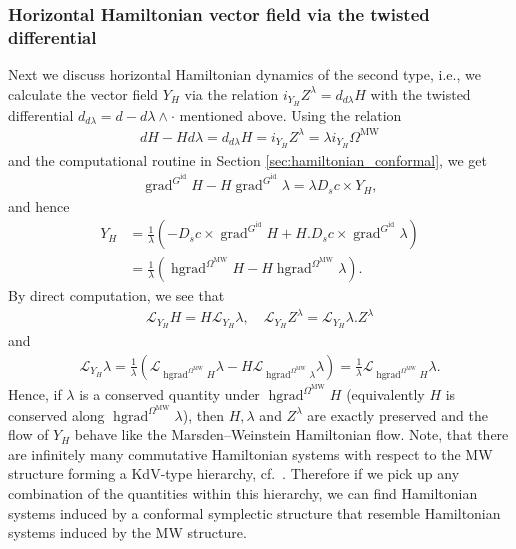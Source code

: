 \documentclass[12pt]{amsart}
\newcommand{\AuthorCOMMENT}[3]{\textcolor{#2}{{[\textbf{#1:} \textsl{#3}}]}}  %
\newcommand{\Sadashige}[1]{\AuthorCOMMENT{Sadashige}{violet}{#1}}
\newcommand{\rev}[1]{#1}
\theoremstyle{definition}
\newcommand{\id}{\mathrm{id}}
\newcommand{\Imm}{\mathrm{Imm}}
\newcommand{\OmMW}{\Omega^{\operatorname{MW}}}
\def\la{\lambda}
\def\L{\mathcal{L}}
\let\on=\operatorname
\begin{document}
\rev{
\subsubsection*{Horizontal Hamiltonian vector field via the twisted differential}
Next we discuss horizontal Hamiltonian dynamics of the second type, i.e., we calculate the vector field $Y_H$ via the relation $i_{Y_H}Z^\lambda = d_{d\lambda}H$ with the twisted differential $d_{d\lambda}= d-d\la\wedge\cdot$ mentioned above. Using the relation
\begin{align}
    dH - Hd\lambda= d_{d\lambda}H=  i_{Y_H}Z^\lambda=\lambda i_{Y_H}\OmMW
\end{align}
and the computational routine in Section \ref{sec:hamiltonian_conformal}, we get 
\begin{align}
    \on{grad}^{G^{\id}}H - H  \on{grad}^{G^{\id}} \lambda = \lambda D_s c \times Y_H,
\end{align}
and hence 
\begin{align}
    Y_H 
    &= \frac{1}{\lambda}\left( -  D_s c \times \on{grad}^{G^{\id}} H  + H. D_s c \times \on{grad}^{G^{\id}} \lambda  \right) \\
    &= \frac{1}{\lambda}\left(\on{hgrad}^{\Omega^{\on{MW}}}H - H \on{hgrad}^{\Omega^{\on{MW}}} \lambda\right).
\end{align}
By direct computation, we see that
\begin{align}
    \L_{Y_H}H=H\L_{Y_H}\lambda, \quad \L_{Y_H}Z^\lambda=\L_{Y_H}\lambda.Z^\lambda
\end{align}
and 
\begin{align}
    \L_{Y_H}\lambda
    = \frac{1}{\lambda}(\L_{\on{hgrad}^{\Omega^{\on{MW}}}H}\lambda - H  \L_{\on{hgrad}^{\Omega^{\on{MW}}}\lambda}\lambda) 
    =  \frac{1}{\lambda}\L_{\on{hgrad}^{\Omega^{\on{MW}}}H}\lambda. 
\end{align}
Hence, if $\lambda$ is a conserved quantity under $\on{hgrad}^{\Omega^{\on{MW}}}H$ (equivalently $H$ is conserved along $\on{hgrad}^{\Omega^{\on{MW}}}\lambda$), then $H,\lambda$ and $Z^\lambda$ are exactly preserved and the flow of $Y_H$ behave like the Marsden--Weinstein Hamiltonian flow.  Note, that there are infinitely many commutative Hamiltonian systems with respect to the MW structure forming a  KdV-type hierarchy, cf.~\cite{chern_knöppel_pedit_pinkall_2020}. Therefore if we pick up any combination of the quantities within this hierarchy, we can find Hamiltonian systems induced by a conformal symplectic structure that resemble Hamiltonian systems induced by the MW structure. 

}
\end{document}
